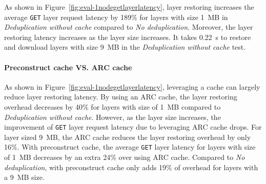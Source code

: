 As shown in Figure~\ref{fig:eval-1nodegetlayerlatency}, 
layer restoring increases the average \texttt{GET} layer request latency by 189\% for layers 
with size 1~MB in \emph{Deduplication without cache} compared to \emph{No deduplication}.
Moreover, the layer restoring latency increases as the layer size increases.
It takes 0.22~s to restore and download layers with size 9~MB in the \emph{Deduplication without cache} test.

\paragraph{Preconstruct cache VS. ARC cache}
As shown in Figure~\ref{fig:eval-1nodegetlayerlatency}, 
leveraging a cache can largely reduce layer restoring latency.
By using an ARC cache, 
the layer restoring overhead decreases by 40\% for layers with size of 1~MB compared to \emph{Deduplication without cache}.
However, as the layer size increases, 
the improvement of \texttt{GET} layer request latency due to leveraging ARC cache drops.
For layer sized 9~MB, the ARC cache reduces the layer restoring overhead by only 16\%. 
With \sysname preconstruct cache, 
the average \texttt{GET} layer latency for layers 
with size of 1~MB decreases by an extra 24\% over using ARC cache.
Compared to \emph{No deduplication}, 
\sysname with preconstruct cache only adds 19\% of overhead for layers with a 9~MB size. 

